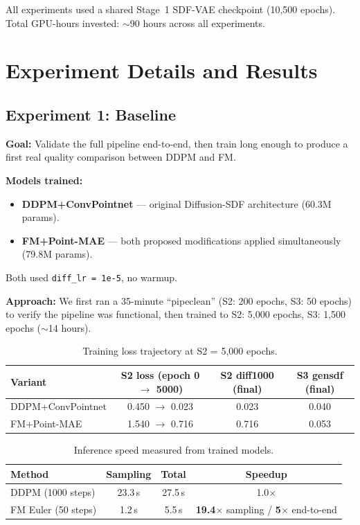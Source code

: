 \documentclass[11pt,letterpaper]{article}
\begin{document}
All experiments used a shared Stage~1 SDF-VAE checkpoint (10{,}500 epochs). Total GPU-hours invested: ${\sim}$90 hours across all experiments.

\section{Experiment Details and Results}

\subsection{Experiment 1: Baseline}

\textbf{Goal:} Validate the full pipeline end-to-end, then train long enough to produce a first real quality comparison between DDPM and FM.

\textbf{Models trained:}
\begin{itemize}
    \item \textbf{DDPM+ConvPointnet} --- original Diffusion-SDF architecture (60.3M params).
    \item \textbf{FM+Point-MAE} --- both proposed modifications applied simultaneously (79.8M params).
\end{itemize}

Both used \texttt{diff\_lr\,=\,1e-5}, no warmup.

\textbf{Approach:} We first ran a 35-minute ``pipeclean'' (S2: 200 epochs, S3: 50 epochs) to verify the pipeline was functional, then trained to S2: 5{,}000 epochs, S3: 1{,}500 epochs (${\sim}$14 hours).

\begin{table}[H]
\centering
\caption{Training loss trajectory at S2 = 5{,}000 epochs.}
\label{tab:baseline-s2}
\begin{tabular}{lccc}
\toprule
Variant & S2 loss (epoch 0 $\to$ 5000) & S2 diff1000 (final) & S3 gensdf (final) \\
\midrule
DDPM+ConvPointnet & 0.450 $\to$ 0.023 & 0.023 & 0.040 \\
FM+Point-MAE      & 1.540 $\to$ 0.716 & 0.716 & 0.053 \\
\bottomrule
\end{tabular}
\end{table}

\begin{table}[H]
\centering
\caption{Inference speed measured from trained models.}
\label{tab:baseline-speed}
\begin{tabular}{lccc}
\toprule
Method & Sampling & Total & Speedup \\
\midrule
DDPM (1000 steps) & 23.3\,s & 27.5\,s & 1.0$\times$ \\
FM Euler (50 steps) & 1.2\,s & 5.5\,s & \textbf{19.4$\times$} sampling / \textbf{5$\times$} end-to-end \\
\bottomrule
\end{tabular}
\end{table}
\end{document}
